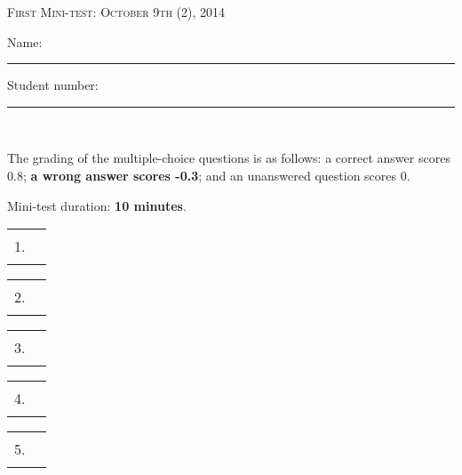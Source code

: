 \documentclass{docist}
\begin{document}
\thispagestyle{empty}

\begin{center}
  {\Large \textsc{First Mini-test: October 9th (2), 2014\\[2ex]}}
  {\normalsize    Name: \rule{8cm}{1pt} Student number: \rule{2cm}{1pt}\\[2ex]}
\end{center}

The grading of the multiple-choice questions is as follows: a correct answer scores 0.8; \textbf{a wrong answer scores -0.3}; and an unanswered question scores 0. 

Mini-test duration: \textbf{10 minutes}. 

\begin{center}
%
  \begin{tabular}{rc}
    1. & \rule{1cm}{1pt} \\[2ex]
  \end{tabular}
  \hspace*{0.7cm}
  \begin{tabular}{rc}
    2. & \rule{1cm}{1pt} \\[2ex]
  \end{tabular}
  \hspace*{0.7cm}
  \begin{tabular}{rc}
    3. & \rule{1cm}{1pt} \\[2ex]
  \end{tabular}
  \hspace*{0.7cm}
  \begin{tabular}{rc}
    4. & \rule{1cm}{1pt} \\[2ex]
  \end{tabular}
  \hspace*{0.7cm}
  \begin{tabular}{rc}
    5. & \rule{1cm}{1pt} \\[2ex]
  \end{tabular}
\end{center}



\qCreateArchitectureTwo

\qComponentViewType

\qHammersNails

\qFunctionalModule

\qPrioritize
\end{document}
